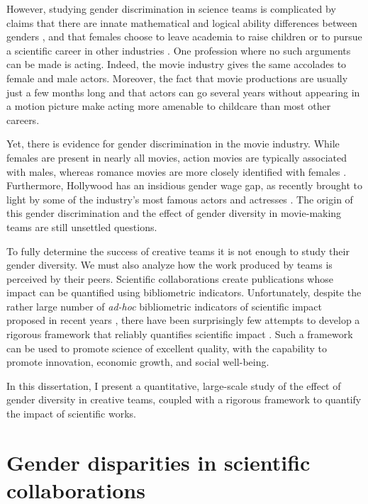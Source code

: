 However, studying gender discrimination in science teams is complicated by claims that there are innate mathematical and logical ability differences between genders \cite{Voyer1995,Hyde2008}, and that females choose to leave academia to raise children \cite{Ceci2011} or to pursue a scientific career in other industries \cite{Etzkowitz2011}. One profession where no such arguments can be made is acting. Indeed, the movie industry gives the same accolades to female and male actors. Moreover, the fact that movie productions are usually just a few months long and that actors can go several years without appearing in a motion picture make acting more amenable to childcare than most other careers.

Yet, there is evidence for gender discrimination in the movie industry. While females are present in nearly all movies, action movies are typically associated with males, whereas romance movies are more closely identified with females \cite{Smith2014,Wuhr2017}. Furthermore, Hollywood has an insidious gender wage gap, as recently brought to light by some of the industry's most famous actors and actresses \cite{Adamczyk2016,Gonzales2016,Sollosi2017}. The origin of this gender discrimination and the effect of gender diversity in movie-making teams are still unsettled questions.

To fully determine the success of creative teams it is not enough to study their gender diversity. We must also analyze how the work produced by teams is perceived by their peers. Scientific collaborations create publications whose impact can be quantified using bibliometric indicators. Unfortunately, despite the rather large number of \textit{ad-hoc} bibliometric indicators of scientific impact proposed in recent years \cite{Hirsch2005,Egghe2006b,Jin2007a,Alonso2009a,Franceschini2010,Bharathi2013,Lando2014,Xu2015,Frittelli2016,Hutchins2016}, there have been surprisingly few attempts to develop a rigorous framework that reliably quantifies scientific impact \cite{Radicchi2008,Stringer2008,Radicchi2009,Petersen2011,Wang2013a}. Such a framework can be used to promote science of excellent quality, with the capability to promote innovation, economic growth, and social well-being.

In this dissertation, I present a quantitative, large-scale study of the effect of gender diversity in creative teams, coupled with a rigorous framework to quantify the impact of scientific works.


\section{Gender disparities in scientific collaborations}


